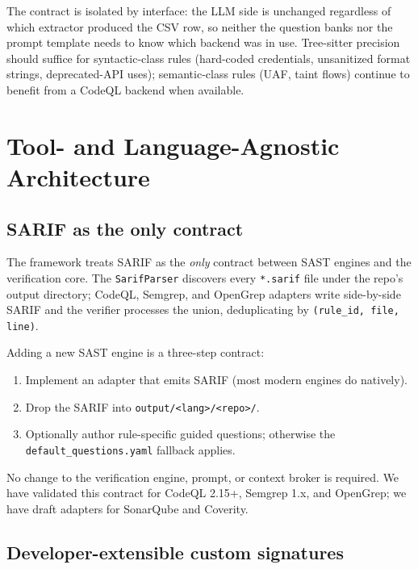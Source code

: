 \documentclass[11pt,a4paper]{article}
\begin{document}
The contract is isolated by interface: the LLM side is unchanged
regardless of which extractor produced the CSV row, so neither the
question banks nor the prompt template needs to know which backend was
in use. Tree-sitter precision should suffice for syntactic-class rules
(hard-coded credentials, unsanitized format strings, deprecated-API
uses); semantic-class rules (UAF, taint flows) continue to benefit
from a CodeQL backend when available.

\section{Tool- and Language-Agnostic Architecture}
\label{sec:architecture}

\subsection{SARIF as the only contract}
\label{sec:sarif-contract}

The framework treats SARIF as the \emph{only} contract between SAST
engines and the verification core. The \texttt{SarifParser} discovers
every \texttt{*.sarif} file under the repo's output directory; CodeQL,
Semgrep, and OpenGrep adapters write side-by-side SARIF and the
verifier processes the union, deduplicating by
\texttt{(rule\_id, file, line)}.

Adding a new SAST engine is a three-step contract:

\begin{enumerate}[leftmargin=*]
\item Implement an adapter that emits SARIF (most modern engines do
  natively).
\item Drop the SARIF into \texttt{output/<lang>/<repo>/}.
\item Optionally author rule-specific guided questions; otherwise the
  \texttt{default\_questions.yaml} fallback applies.
\end{enumerate}

No change to the verification engine, prompt, or context broker is
required. We have validated this contract for CodeQL 2.15+, Semgrep
1.x, and OpenGrep; we have draft adapters for SonarQube and Coverity.

\subsection{Developer-extensible custom signatures}
\label{sec:custom-signatures}
\end{document}
